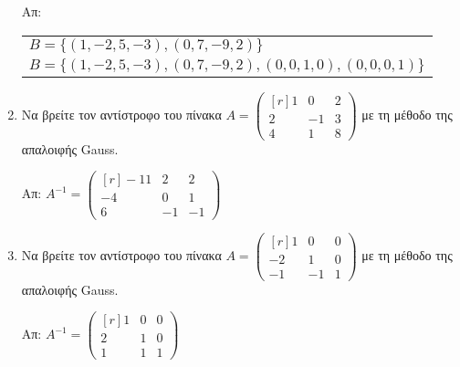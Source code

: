 \begin{enumerate}
		\hfill Απ:  \begin{tabular}{l}
			$B = \{ (1,-2,5,-3), (0,7,-9,2) \}$ \\
			$ B = \{ (1,-2,5,-3), (0,7,-9,2), (0,0,1,0), (0,0,0,1) \} $
		\end{tabular} 

	\item Να βρείτε τον αντίστροφο του πίνακα $ A = 
		\begin{pmatrix*}[r]
			1 & 0 & 2 \\
			2 & -1 & 3 \\
			4 & 1 & 8
		\end{pmatrix*}$ με τη μέθοδο της απαλοιφής Gauss.

		\hfill Απ: $ A^{-1} = 
		\begin{pmatrix*}[r]
			-11 & 2 & 2 \\
			-4 & 0 & 1 \\
			6 & -1 & -1
		\end{pmatrix*} $ 

	\item Να βρείτε τον αντίστροφο του πίνακα $ A = 
		\begin{pmatrix*}[r]
			1 & 0 & 0 \\
			-2 & 1 & 0 \\
			-1 & -1 & 1
		\end{pmatrix*}$ με τη μέθοδο της απαλοιφής Gauss.

		\hfill Απ: $ A^{-1} = 
		\begin{pmatrix*}[r]
			1 & 0 & 0 \\
			2 & 1 & 0 \\
			1 & 1 & 1
		\end{pmatrix*}$



\end{enumerate}




